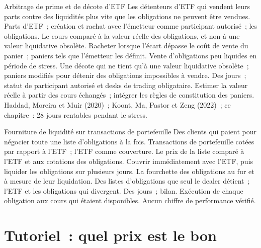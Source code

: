 \begin{strategyfile}{Arbitrage de prime et de décote d'ETF}\label{strat:s2:systematic-credit-and-bond-etf-arbitrage:etf}
 Les détenteurs d'ETF qui vendent leurs parts contre des liquidités plus vite que les obligations ne peuvent être vendues.
 Parts d'ETF~; création et rachat avec l'émetteur comme participant autorisé~; les obligations.
 Le cours comparé à la valeur réelle des obligations, et non à une valeur liquidative obsolète.
 Racheter lorsque l'écart dépasse le coût de vente du panier~; paniers tels que l'émetteur les définit.
 Vente d'obligations peu liquides en période de stress.
 Une décote qui ne tient qu'à une valeur liquidative obsolète~; paniers modifiés pour détenir des obligations impossibles à vendre.
 Des jours~; statut de participant autorisé et desks de trading obligataire.
 Estimer la valeur réelle à partir des cours échangés~; intégrer les règles de constitution des paniers.
 Haddad, Moreira et Muir (2020)~; Koont, Ma, Pastor et Zeng (2022)~; ce chapitre~: 28 jours rentables pendant le stress.
\end{strategyfile}

\begin{strategyfile}{Fourniture de liquidité sur transactions de portefeuille}\label{strat:s2:systematic-credit-and-bond-etf-arbitrage:portfolio}
 Des clients qui paient pour négocier toute une liste d'obligations à la fois.
 Transactions de portefeuille cotées par rapport à l'ETF~; l'ETF comme couverture.
 Le prix de la liste comparé à l'ETF et aux cotations des obligations.
 Couvrir immédiatement avec l'ETF, puis liquider les obligations sur plusieurs jours.
 La fourchette des obligations au fur et à mesure de leur liquidation.
 Des listes d'obligations que seul le dealer détient~; l'ETF et les obligations qui divergent.
 Des jours~; bilan.
 Exécution de chaque obligation aux cours qui étaient disponibles.
 Aucun chiffre de performance vérifié.
\end{strategyfile}

\section{Tutoriel~: quel prix est le bon}\label{tut:s2:systematic-credit-and-bond-etf-arbitrage:tut}

